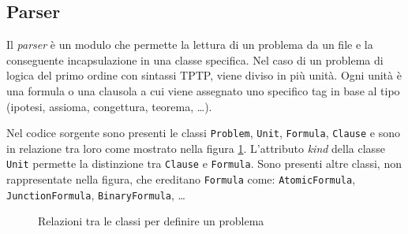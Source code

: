 \subsection{Parser}
Il \emph{parser} è un modulo che permette la lettura di un problema da un file e la conseguente incapsulazione in una classe specifica.
Nel caso di un problema di logica del primo ordine con sintassi TPTP, viene diviso in più unità.
Ogni unità è una formula o una clausola a cui viene assegnato uno specifico tag in base al tipo (ipotesi, assioma, congettura, teorema, \dots).

Nel codice sorgente sono presenti le classi \verb|Problem|, \verb|Unit|, \verb|Formula|, \verb|Clause| e sono in relazione tra loro come mostrato nella figura \ref{fig:relazioni-classi}.
L'attributo \emph{kind} della classe \verb|Unit| permette la distinzione tra \verb|Clause| e \verb|Formula|.
Sono presenti altre classi, non rappresentate nella figura, che ereditano \verb|Formula| come:
\verb|AtomicFormula|, \verb|JunctionFormula|, \verb|BinaryFormula|, \dots 
\vspace{.3cm}
\begin{figure}[H]
    \caption{Relazioni tra le classi per definire un problema}
    \label{fig:relazioni-classi}
\end{figure}
